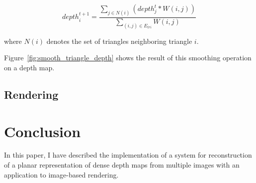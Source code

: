 \documentclass[conference]{acmsiggraph}
\begin{document}
\begin{equation}
    \label{eq:smoothing}
    depth_i^{t + 1} = \dfrac{
        \sum_{j \in N(i)}
        \left(
            depth_j^{t} * W(i, j)
        \right)
    }
    {
        \sum_{(i, j) \in E_{tri}}
            W(i, j)
    }
\end{equation}

where $N(i)$ denotes the set of triangles neighboring triangle $i$.

Figure~\ref{fig:smooth_triangle_depth} shows the result of this smoothing
operation on a depth map.

\subsection{Rendering}





\section{Conclusion}

In this paper, I have described the implementation of a system for
reconstruction of a planar representation of dense depth maps from multiple images
with an application to image-based rendering.
\end{document}
